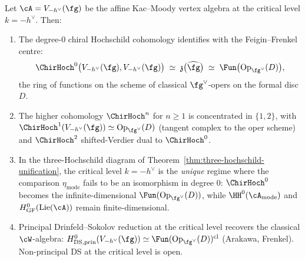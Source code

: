 \begin{theorem}%
\label{thm:feigin-frenkel-chirhoch}%
%
%
%
%
Let $\cA = V_{-h^\vee}(\fg)$ be the affine Kac--Moody vertex algebra at
the critical level $k=-h^\vee$. Then:
\begin{enumerate}[label=\textup{(\roman*)}]
\item\label{item:ff-chh0} The degree-$0$ chiral Hochschild cohomology
identifies with the Feigin--Frenkel centre:
\[
\ChirHoch^0\bigl(V_{-h^\vee}(\fg),V_{-h^\vee}(\fg)\bigr)
\;\simeq\;
\mathfrak z\bigl(\widehat{\fg}\bigr)
\;\simeq\;
\Fun\bigl(\mathrm{Op}_{\fg^\vee}(D)\bigr),
\]
the ring of functions on the scheme of classical $\fg^\vee$-opers on
the formal disc $D$.
\item\label{item:ff-higher} The higher cohomology $\ChirHoch^n$ for
$n\ge 1$ is concentrated in $\{1,2\}$, with
$\ChirHoch^1(V_{-h^\vee}(\fg))\simeq \mathrm{Op}_{\fg^\vee}(D)$
(tangent complex to the oper scheme) and $\ChirHoch^2$ shifted-Verdier
dual to $\ChirHoch^0$.
\item\label{item:ff-threeway} In the three-Hochschild diagram of
Theorem~\ref{thm:three-hochschild-unification}, the critical level
$k=-h^\vee$ is the \emph{unique} regime where the comparison
$\eta_{\mathrm{mode}}$ fails to be an isomorphism in degree $0$:
$\ChirHoch^0$ becomes the infinite-dimensional
$\Fun(\mathrm{Op}_{\fg^\vee}(D))$, while $\HH^0(\cA_{\mathrm{mode}})$
and $H^0_{\mathrm{GF}}(\mathrm{Lie}(\cA))$ remain finite-dimensional.
\item\label{item:ff-ds} Principal Drinfeld--Sokolov reduction at the
critical level recovers the classical $\cW$-algebra:
$H^0_{\mathrm{DS,prin}}(V_{-h^\vee}(\fg))\simeq
\Fun(\mathrm{Op}_{\fg^\vee}(D))^{\mathrm{cl}}$ (Arakawa, Frenkel).
Non-principal DS at the critical level is open.
\end{enumerate}
\end{theorem}

